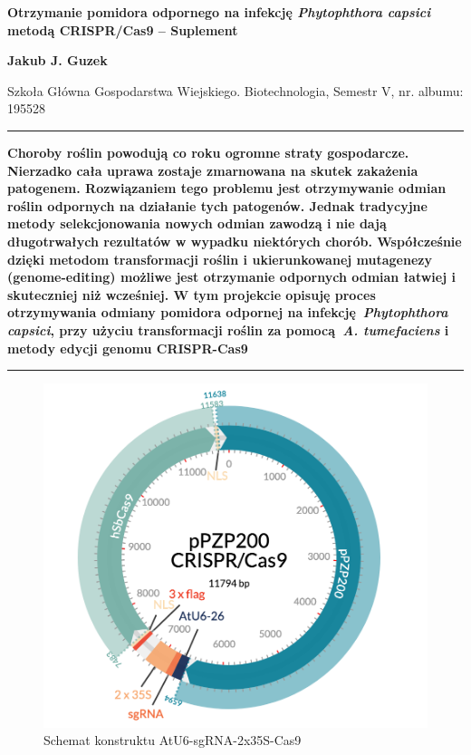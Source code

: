 \documentclass[twoside, a4paper]{article}
\begin{document}
	{\sc \bfseries \LARGE {}\selectfont Otrzymanie pomidora odpornego na infekcję \textit{Phytophthora capsici} metodą CRISPR/Cas9 -- Suplement } \vspace{\baselineskip}

{\bfseries \large Jakub J. Guzek}

{Szkoła Główna Gospodarstwa Wiejskiego. Biotechnologia, Semestr V, nr. albumu: 195528}\vspace{\baselineskip}

\hrule

	\textbf{\textsf{Choroby roślin powodują co roku ogromne straty gospodarcze. Nierzadko cała uprawa zostaje zmarnowana na skutek zakażenia patogenem. Rozwiązaniem tego problemu jest otrzymywanie odmian roślin odpornych na działanie tych patogenów. Jednak tradycyjne metody selekcjonowania nowych odmian zawodzą i nie dają długotrwałych rezultatów w wypadku niektórych chorób. Współcześnie dzięki metodom transformacji roślin i ukierunkowanej mutagenezy (genome-editing) możliwe jest otrzymanie odpornych odmian łatwiej i skuteczniej niż wcześniej. W tym projekcie opisuję proces otrzymywania odmiany pomidora odpornej na infekcję \textit{Phytophthora capsici}, przy użyciu transformacji roślin za pomocą \textit{A. tumefaciens} i metody edycji genomu CRISPR-Cas9}}\vspace{\baselineskip}

\hrule

 \begin{figure}[h]
	 \centering
	 \includegraphics[width=\textwidth]{./figures/pPZP200-CRISPR.png}
	 \caption{Schemat konstruktu AtU6-sgRNA-2x35S-Cas9\protect\footnotemark}
\end{figure}
\end{document}
